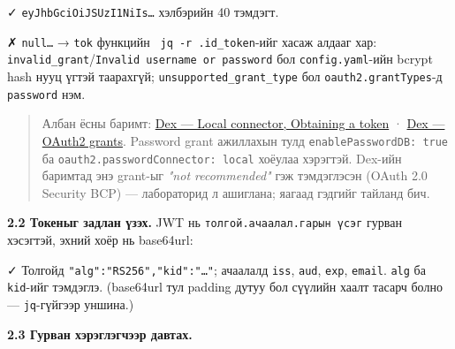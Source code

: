 ✓ \texttt{eyJhbGciOiJSUzI1NiIs\ldots{}} хэлбэрийн 40 тэмдэгт.

✗ \texttt{null\ldots{}} → \texttt{tok} функцийн \texttt{\textbar{}\ jq\ -r\ .id\_token}-ийг хасаж алдааг хар: \texttt{invalid\_grant}/\allowbreak\texttt{Invalid\ username\ or\ password} бол \texttt{config.yaml}-ийн bcrypt hash нууц үгтэй таарахгүй; \texttt{unsupported\_\allowbreak{}grant\_\allowbreak{}type} бол \texttt{oauth2.\allowbreak{}grantTypes}-д \texttt{password} нэм.

\begin{quote}
Албан ёсны баримт: \href{https://dexidp.io/docs/connectors/local/}{Dex --- Local connector, Obtaining a token} · \href{https://dexidp.io/docs/configuration/oauth2/}{Dex --- OAuth2 grants}. Password grant ажиллахын тулд \texttt{enablePasswordDB:\allowbreak{}\ true} ба \texttt{oauth2.\allowbreak{}passwordConnector:\allowbreak{}\ local} хоёулаа хэрэгтэй. Dex-ийн баримтад энэ grant-ыг \emph{"not recommended"} гэж тэмдэглэсэн (OAuth 2.0 Security BCP) --- лабораторид л ашиглана; яагаад гэдгийг тайланд бич.
\end{quote}

\textbf{2.2 Токеныг задлан үзэх.} JWT нь \texttt{толгой.\allowbreak{}ачаалал.\allowbreak{}гарын\ үсэг} гурван хэсэгтэй, эхний хоёр нь base64url:

\begin{Shaded}
\begin{Highlighting}[]
  \KeywordTok{|} \KeywordTok{|} \OperatorTok{2\textgreater{}}\KeywordTok{;} 
  \KeywordTok{|} \KeywordTok{|} \OperatorTok{2\textgreater{}}\KeywordTok{;} 
\end{Highlighting}
\end{Shaded}

✓ Толгойд \texttt{"alg":\allowbreak{}"RS256","kid":\allowbreak{}"\ldots{}"}; ачаалалд \texttt{iss}, \texttt{aud}, \texttt{exp}, \texttt{email}. \texttt{alg} ба \texttt{kid}-ийг тэмдэглэ. (base64url тул padding дутуу бол сүүлийн хаалт тасарч болно --- \texttt{jq}-гүйгээр уншина.)

\textbf{2.3 Гурван хэрэглэгчээр давтах.}

